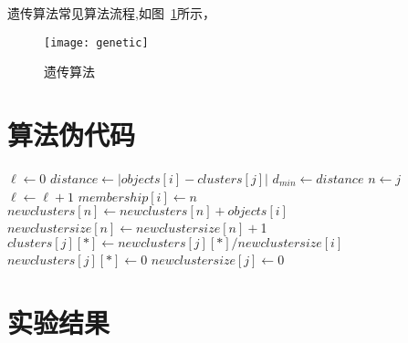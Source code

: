     遗传算法常见算法流程,如图~\ref{fig:genetic}所示，

    \begin{figure}[htbp]
    \centering
    \texttt{[image: genetic]}
    \caption{遗传算法}\label{fig:genetic}
    \vspace{\baselineskip}
    \end{figure}

            
\section{算法伪代码}
\begin{algorithmic}
    \State $\ell \gets 0$
        \State  $   distance \gets |objects[i]-clusters[j]|$ 
        \State  $ d_{min} \gets distance $
                \State $n \gets j$
            \EndIf    
        \EndFor
            \State $\ell \gets \ell + 1$
            \State $ membership[i] \gets n$
        \EndIf
       \State $newclusters[n] \gets newclusters[n]+objects[i] $
       \State $newclustersize[n] \gets  newclustersize[n]+$1
    \EndFor
       \State $clusters[j][*] \gets newclusters[j][*]/newclustersize[i] $
       \State $newclusters[j][*] \gets 0 $
       \State $newclustersize[j] \gets 0$
    \EndFor 
    \EndWhile
\end{algorithmic}

\section{实验结果}



